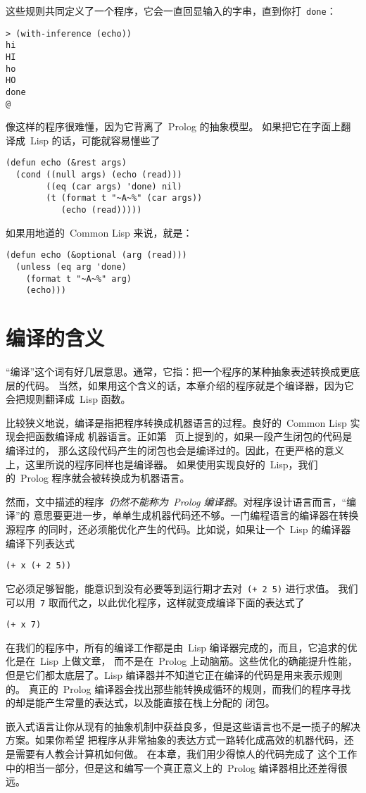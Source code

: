 这些规则共同定义了一个程序，它会一直回显输入的字串，直到你打~\verb|done|：
\begin{lstlisting}
> (with-inference (echo))
hi
HI
ho
HO
done
@
\end{lstlisting}
像这样的程序很难懂，因为它背离了~Prolog 的抽象模型。
如果把它在字面上翻译成~Lisp 的话，可能就容易懂些了

\begin{lstlisting}
(defun echo (&rest args)
  (cond ((null args) (echo (read)))
        ((eq (car args) 'done) nil)
        (t (format t "~A~%" (car args))
           (echo (read)))))
\end{lstlisting}
如果用地道的~Common Lisp 来说，就是：
\begin{lstlisting}
(defun echo (&optional (arg (read)))
  (unless (eq arg 'done)
    (format t "~A~%" arg)
    (echo)))
\end{lstlisting}

\section{编译的含义}
\label{sec:the_senses_of_compile}

``编译''这个词有好几层意思。通常，它指：把一个程序的某种抽象表述转换成更底层的代码。
当然，如果用这个含义的话，本章介绍的程序就是个编译器，因为它会把规则翻译成~Lisp 函数。

比较狭义地说，编译是指把程序转换成机器语言的过程。良好的~Common Lisp 实现会把函数编译成
机器语言。正如第~\pageref{page:compile} 页上提到的，如果一段产生闭包的代码是编译过的，
那么这段代码产生的闭包也会是编译过的。因此，在更严格的意义上，这里所说的程序同样也是编译器。
如果使用实现良好的~Lisp，我们的~Prolog 程序就会被转换成为机器语言。

然而，文中描述的程序~\emph{仍然不能称为~Prolog 编译器}。对程序设计语言而言，``编译''的
意思要更进一步，单单生成机器代码还不够。一门编程语言的编译器在转换源程序
的同时，还必须能优化产生的代码。比如说，如果让一个~Lisp 的编译器编译下列表达式
\begin{lstlisting}
(+ x (+ 2 5))
\end{lstlisting}
它必须足够智能，能意识到没有必要等到运行期才去对~\verb|(+ 2 5)| 进行求值。
我们可以用~\verb|7| 取而代之，以此优化程序，这样就变成编译下面的表达式了

\begin{lstlisting}
(+ x 7)
\end{lstlisting}

在我们的程序中，所有的编译工作都是由~Lisp 编译器完成的，而且，它追求的优化是在~Lisp 上做文章，
而不是在~Prolog 上动脑筋。这些优化的确能提升性能，但是它们都太底层了。Lisp 编译器并不知道它正在编译的代码是用来表示规则的。
真正的~Prolog 编译器会找出那些能转换成循环的规则，而我们的程序寻找的却是能产生常量的表达式，以及能直接在栈上分配的
闭包。

嵌入式语言让你从现有的抽象机制中获益良多，但是这些语言也不是一揽子的解决方案。如果你希望
把程序从非常抽象的表达方式一路转化成高效的机器代码，还是需要有人教会计算机如何做。
在本章，我们用少得惊人的代码完成了
这个工作中的相当一部分，但是这和编写一个真正意义上的~Prolog 编译器相比还差得很远。

